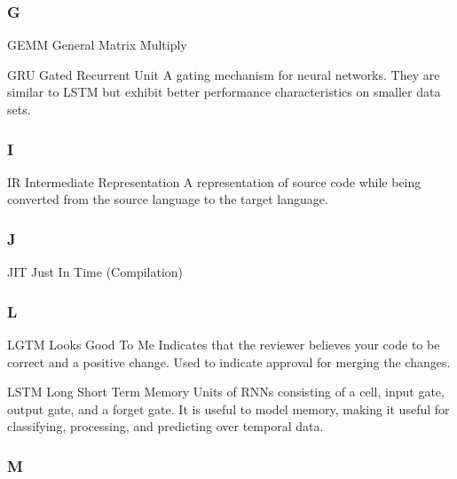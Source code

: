 \subsubsection*{G}


\begin{DoxyItemize}
\item G\+E\+MM General Matrix Multiply
\item G\+RU Gated Recurrent Unit A gating mechanism for neural networks. They are similar to L\+S\+TM but exhibit better performance characteristics on smaller data sets.
\end{DoxyItemize}

\subsubsection*{I}


\begin{DoxyItemize}
\item IR Intermediate Representation A representation of source code while being converted from the source language to the target language.
\end{DoxyItemize}

\subsubsection*{J}


\begin{DoxyItemize}
\item J\+IT Just In Time (Compilation)
\end{DoxyItemize}

\subsubsection*{L}


\begin{DoxyItemize}
\item L\+G\+TM Looks Good To Me Indicates that the reviewer believes your code to be correct and a positive change. Used to indicate approval for merging the changes.
\item L\+S\+TM Long Short Term Memory Units of R\+N\+Ns consisting of a cell, input gate, output gate, and a forget gate. It is useful to model memory, making it useful for classifying, processing, and predicting over temporal data.
\end{DoxyItemize}

\subsubsection*{M}


